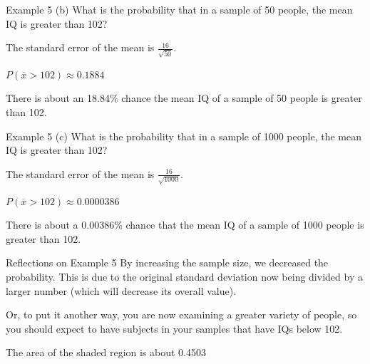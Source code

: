 \documentclass[t]{beamer}
\begin{document}
\begin{frame}{Example 5}
(b)	\quad	What is the probability that in a sample of 50 people, the mean IQ is greater than 102?	\newline\\	\pause

The standard error of the mean is $\frac{16}{\sqrt{50}}$.	\newline\\	\pause

$P(\overline{x} > 102) \approx 0.1884$	\newline\\	\pause

There is about an 18.84\% chance the mean IQ of a sample of 50 people is greater than 102.
\end{frame}

\begin{frame}{Example 5}
(c)	\quad What is the probability that in a sample of 1000 people, the mean IQ is greater than 102?	\newline\\	\pause

The standard error of the mean is $\frac{16}{\sqrt{1000}}$.	\newline\\	\pause

$P(\overline{x} > 102) \approx 0.0000386$	\newline\\	\pause

There is about a 0.00386\% chance that the mean IQ of a sample of 1000 people is greater than 102.
\end{frame}

\begin{frame}{Reflections on Example 5}
By increasing the sample size, we decreased the probability. This is due to the original standard deviation now being divided by a larger number (which will decrease its overall value).	\newline\\	\pause

Or, to put it another way, you are now examining a greater variety of people, so you should expect to have subjects in your samples that have IQs below 102.
\begin{center}
\end{center}
The area of the shaded region is about 0.4503
\end{frame}
\end{document}

